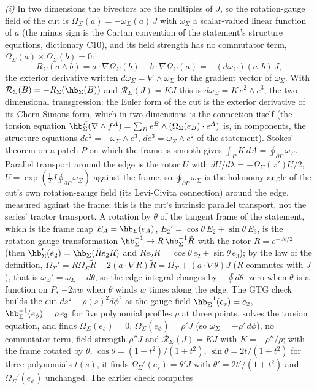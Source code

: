 \emph{(i)} In two dimensions the bivectors are the multiples of $J$, so the rotation-gauge field of the cut is $\Omega_{\Sigma}(a) = -\omega_{\Sigma}(a)\,J$ with $\omega_{\Sigma}$ a scalar-valued linear function of $a$ (the minus sign is the Cartan convention of the statement's structure equations, dictionary C10), and its field strength has no commutator term, $\Omega_{\Sigma}(a)\times\Omega_{\Sigma}(b) = 0$:
\[
R_{\Sigma}(a\wedge b) = a\cdot\nabla\Omega_{\Sigma}(b) - b\cdot\nabla\Omega_{\Sigma}(a) = -(d\omega_{\Sigma})(a, b)\,J ,
\]
the exterior derivative written $d\omega_{\Sigma} = \nabla\wedge\omega_{\Sigma}$ for the gradient vector of $\omega_{\Sigma}$. With $\mathcal{R}_{\Sigma}(B) = -R_{\Sigma}(\hb_{\Sigma}(B))$ and $\mathcal{R}_{\Sigma}(J) = KJ$ this is $d\omega_{\Sigma} = K\,e^{2}\wedge e^{3}$, the two-dimensional transgression: the Euler form of the cut is the exterior derivative of its Chern-Simons form, which in two dimensions is the connection itself (the torsion equation $\hb_{\Sigma}^{T}(\nabla\wedge f^{A}) = \sum_{B}e^{B}\wedge(\Omega_{\Sigma}(e_{B})\cdot e^{A})$ is, in components, the structure equations $de^{2} = -\omega_{\Sigma}\wedge e^{3}$, $de^{3} = \omega_{\Sigma}\wedge e^{2}$ of the statement). Stokes' theorem on a patch $P$ on which the frame is smooth gives $\int_{P}K\,dA = \oint_{\partial P}\omega_{\Sigma}$. Parallel transport around the edge is the rotor $U$ with $dU/d\lambda = -\Omega_{\Sigma}(x')U/2$, $U = \exp(\tfrac12 J\oint_{\partial P}\omega_{\Sigma})$ against the frame, so $\oint_{\partial P}\omega_{\Sigma}$ is the holonomy angle of the cut's own rotation-gauge field (its Levi-Civita connection) around the edge, measured against the frame; this is the cut's intrinsic parallel transport, not the series' tractor transport. A rotation by $\theta$ of the tangent frame of the statement, which is the frame map $E_{A} = \hb_{\Sigma}(e_{A})$, $E_{2}' = \cos\theta\,E_{2} + \sin\theta\,E_{3}$, is the rotation gauge transformation $\hb_{\Sigma}^{-1} \mapsto R\,\hb_{\Sigma}^{-1}\tilde R$ with the rotor $R = e^{-J\theta/2}$ (then $\hb_{\Sigma}'(e_{2}) = \hb_{\Sigma}(\tilde R e_{2}R)$ and $\tilde R e_{2}R = \cos\theta\,e_{2} + \sin\theta\,e_{3}$); by the law of the definition, $\Omega_{\Sigma}' = R\Omega_{\Sigma}\tilde R - 2(a\cdot\nabla R)\tilde R = \Omega_{\Sigma} + (a\cdot\nabla\theta)J$ ($R$ commutes with $J$), that is $\omega_{\Sigma}' = \omega_{\Sigma} - d\theta$, so the edge integral changes by $-\oint d\theta$: zero when $\theta$ is a function on $P$, $-2\pi w$ when $\theta$ winds $w$ times along the edge. The GTG check builds the cut $ds^{2} + \rho(s)^{2}d\phi^{2}$ as the gauge field $\hb_{\Sigma}^{-1}(e_{s}) = e_{2}$, $\hb_{\Sigma}^{-1}(e_{\phi}) = \rho\,e_{3}$ for five polynomial profiles $\rho$ at three points, solves the torsion equation, and finds $\Omega_{\Sigma}(e_{s}) = 0$, $\Omega_{\Sigma}(e_{\phi}) = \rho' J$ (so $\omega_{\Sigma} = -\rho'\,d\phi$), no commutator term, field strength $\rho''J$ and $\mathcal{R}_{\Sigma}(J) = KJ$ with $K = -\rho''/\rho$; with the frame rotated by $\theta$, $\cos\theta = (1 - t^{2})/(1 + t^{2})$, $\sin\theta = 2t/(1 + t^{2})$ for three polynomials $t(s)$, it finds $\Omega_{\Sigma}'(e_{s}) = \theta' J$ with $\theta' = 2t'/(1 + t^{2})$ and $\Omega_{\Sigma}'(e_{\phi})$ unchanged. The earlier check computes 
